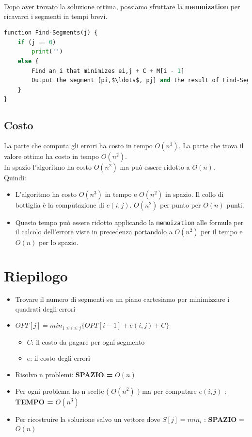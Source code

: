 Dopo aver trovato la soluzione ottima, possiamo sfruttare la
\textbf{memoization} per ricavarci i segmenti in tempi brevi.

\begin{lstlisting}[language=Python, mathescape=true]
function Find-Segments(j) {
    if (j == 0) 
        print('')
    else {
        Find an i that minimizes ei,j + C + M[i - 1]
        Output the segment {pi,$\ldots$, pj} and the result of Find-Segments(i - 1)
    }
}
\end{lstlisting}

\subsection{Costo}

La parte che computa gli errori ha costo in tempo $O(n^3)$. La parte
che trova il valore ottimo ha costo in tempo $O(n^2)$.\\

In spazio l'algoritmo ha costo $O(n^2)$ ma può essere ridotto a
$O(n)$.\\

Quindi:
\begin{itemize}
  \item L'algoritmo ha costo $O(n^3)$ in tempo e $O(n^2)$ in
        spazio. Il collo di bottiglia è la computazione di $e(i, j)$.
        $O(n^2)$ per punto per $O(n)$ punti.
  \item Questo tempo può essere
        ridotto applicando la \texttt{memoization} alle formule per il calcolo
        dell'errore viste in precedenza portandolo a $O(n^2)$ per il tempo e
        $O(n)$ per lo spazio.
\end{itemize}

\section{Riepilogo}

\begin{itemize}
  \item
        Trovare il numero di segmenti su un piano cartesiamo per minimizzare i
        quadrati degli errori
  \item
        $OPT[j] = min_{1 \le i \le j } \{ OPT[i-1] + e(i,j) + C \}$

        \begin{itemize}
          \item
                $C$: il costo da pagare per ogni segmento
          \item
                $e$: il costo degli errori
        \end{itemize}
  \item
        Risolvo n problemi: \textbf{SPAZIO =} $O(n)$
  \item
        Per ogni problema ho n scelte ( $O(n^2)$ ) ma per computare
        $e(i,j)$ : \textbf{TEMPO =} $O(n^3)$
  \item
        Per ricostruire la soluzione salvo un vettore dove $S[j] = min_i$ :
        \textbf{SPAZIO} = $O(n)$
\end{itemize}

